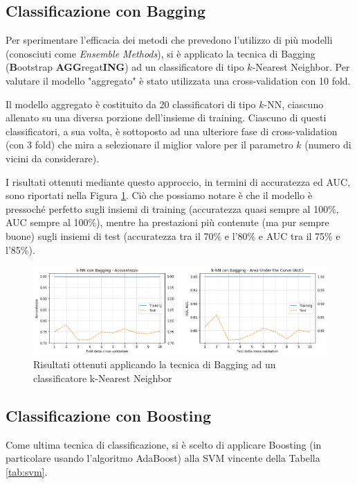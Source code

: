 \documentclass[a4paper]{article}
\begin{document}
\subsection{Classificazione con Bagging}

Per sperimentare l'efficacia dei metodi che prevedono l'utilizzo di più modelli (conosciuti come \emph{Ensemble Methods}), si è applicato la tecnica di Bagging (\textbf{B}ootstrap \textbf{AGG}regat\textbf{ING}) ad un classificatore di tipo $k$-Nearest Neighbor. Per valutare il modello "aggregato" è stato utilizzata una cross-validation con 10 fold. 

Il modello aggregato è costituito da 20 classificatori di tipo $k$-NN, ciascuno allenato su una diversa porzione dell'insieme di training. Ciascuno di questi classificatori, a sua volta, è sottoposto ad una ulteriore fase di cross-validation (con 3 fold) che mira a selezionare il miglior valore per il parametro $k$ (numero di vicini da considerare).

I risultati ottenuti mediante questo approccio, in termini di accuratezza ed AUC, sono riportati nella Figura \ref{fig:bagging}. Ciò che possiamo notare è che il modello è pressoché perfetto sugli insiemi di training (accuratezza quasi sempre al 100\%, AUC sempre al 100\%), mentre ha prestazioni più contenute (ma pur sempre buone) sugli insiemi di test (accuratezza tra il 70\% e l'80\% e AUC tra il 75\% e l'85\%).

\begin{figure}[h]
	\includegraphics[width=\textwidth]{images/bagging.png}
	\caption{Risultati ottenuti applicando la tecnica di Bagging ad un classificatore k-Nearest Neighbor}	
	\label{fig:bagging}	
\end{figure}



\subsection{Classificazione con Boosting}
Come ultima tecnica di classificazione, si è scelto di applicare Boosting (in particolare usando l'algoritmo AdaBoost) alla SVM vincente della Tabella \ref{tab:svm}. 
\end{document}

